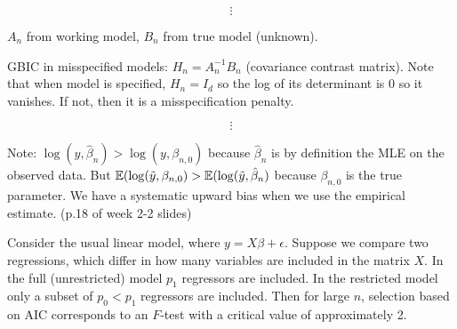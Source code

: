 \[
\vdots
\]

\(A_n\) from working model, \(B_n\) from true model (unknown).

GBIC in misspecified models: \(H_n = A_n^{-1} B_n\) (covariance contrast matrix). Note that when model is specified, \(H_n = I_d\) so the log of its determinant is 0 so it vanishes. If not, then it is a misspecification penalty.

\[
\vdots
\]

Note: \(\log(y, \hat{\beta}_n) > \log(y, \beta_{n,0})\) because \(\hat{\beta}_n\) is by definition the MLE on the observed data. But \(\E(\log(\tilde{y}, \beta_{n,0}) > \E(\log(\tilde{y}, \hat{\beta}_n)\) because \(\beta_{n,0}\) is the true parameter. We have a systematic upward bias when we use the empirical estimate. (p.18 of week 2-2 slides)

\begin{proposition}Consider the usual linear model, where \(y = X\beta + \epsilon\). Suppose we compare two regressions, which differ in how many variables are included in the matrix \(X\). In the full (unrestricted) model \(p_1\) regressors are included. In the restricted model only a subset of \(p_0 < p_1\) regressors are included. Then for large \(n\), selection based on AIC corresponds to an \(F\)-test with a critical value of approximately 2.

\end{proposition}

